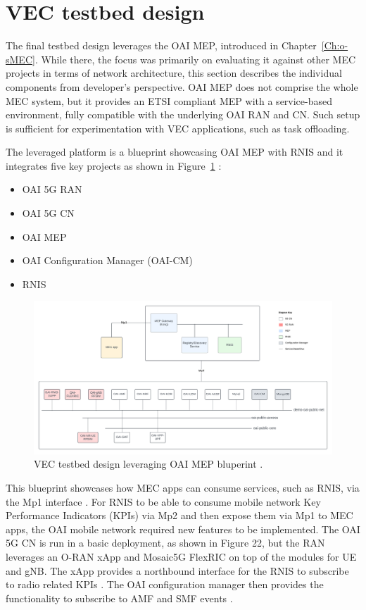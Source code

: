 \documentclass[12pt,a4paper,twoside]{report}
\begin{document}
\section{VEC testbed design}
The final testbed design leverages the OAI MEP, introduced in Chapter~\ref{Ch:o-sMEC}. While there, the focus was primarily on evaluating it against other MEC projects in terms of network architecture, this section describes the individual components from developer’s perspective. OAI MEP does not comprise the whole MEC system, but it provides an ETSI compliant MEP with a service-based environment, fully compatible with the underlying OAI RAN and CN. Such setup is sufficient for experimentation with VEC applications, such as task offloading.

The leveraged platform is a blueprint showcasing OAI MEP with RNIS and it integrates five key projects as shown in Figure~\ref{F:VEC-tstbed-arch} \cite{oai-blueprint-git}:
%
\begin{itemize}
	\item OAI 5G RAN
	\item OAI 5G CN
	\item OAI MEP
	\item OAI Configuration Manager (OAI-CM)
	\item RNIS
\end{itemize}
%
\begin{figure}[ht]
	\centering
	\begin{sideways}
		\includegraphics[width=20cm]{./images/OAI-MEP-parts.png} 	
	\end{sideways}
	\caption{VEC testbed design leveraging OAI MEP bluperint \cite{oai-blueprint-git}.}
	\label{F:VEC-tstbed-arch}
\end{figure}
%
This blueprint showcases how MEC apps can consume services, such as RNIS, via the Mp1 interface \cite{oai-blueprint-git}. For RNIS to be able to consume mobile network Key Performance Indicators (KPIs) via Mp2 and then expose them via Mp1 to MEC apps, the OAI mobile network required new features to be implemented. The OAI 5G CN is run in a basic deployment, as shown in Figure 22, but the RAN leverages an O-RAN xApp and Mosaic5G FlexRIC on top of the modules for UE and gNB. The xApp provides a northbound interface for the RNIS to subscribe to radio related KPIs \cite{oai-rnis-git}. The OAI configuration manager then provides the functionality to subscribe to AMF and SMF events \cite{oai-cm-git}.
\end{document}
